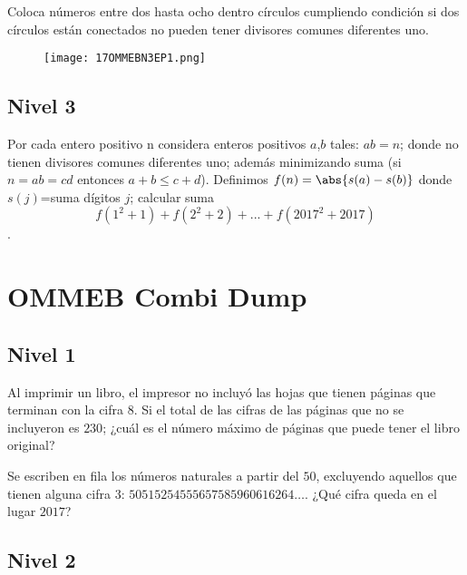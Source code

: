\begin{problem}[OMMEB 2017]
    Coloca números entre dos hasta ocho dentro círculos 
    cumpliendo condición si dos círculos están conectados no 
    pueden tener divisores comunes diferentes uno.
\end{problem}

\begin{figure}[h]
    \centering
    \texttt{[image: 17OMMEBN3EP1.png]}
\end{figure}

\section{Nivel 3}

\begin{problem}[OMMEB 2017]
    Por cada entero positivo n considera enteros positivos 
    $a$,$b$ tales: $ab=n$; donde no tienen divisores comunes 
    diferentes uno; además minimizando suma (si $n=ab=cd$ 
    entonces $a+b\le c+d$). Definimos $f(n)=\abs{s(a)-s(b)}$ 
    donde $s(j)$=suma dígitos $j$; calcular suma 
    \[f(1^2+1)+f(2^2+2)+...+f(2017^2+2017)\].
\end{problem}

\chapter{OMMEB Combi Dump}

\section{Nivel 1}

\begin{problem}[OMMEB 2017]
    Al imprimir un libro, el impresor no incluyó las hojas que 
    tienen páginas que terminan con la cifra \(8\). 
    Si el total de las cifras de las páginas que no se 
    incluyeron es \(230\); ¿cuál es el número máximo de páginas 
    que puede tener el libro original?
\end{problem}

\begin{problem}[OMMEB 2017]
    Se escriben en fila los números naturales a partir del 
    \(50\), excluyendo aquellos que tienen alguna cifra \(3\): 
    \(50515254555657585960616264 \ldots\). 
    ¿Qué cifra queda en el lugar \(2017\)?
\end{problem}

\section{Nivel 2}

